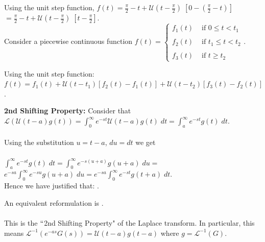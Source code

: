 \documentclass{ximera}
\begin{document}
\newpage

 Using the unit step function, $f(t)=\frac{\pi}{2}-t+\mathcal{U}\left(t-\frac{\pi}{2}\right)\;\left[0-\left(\frac{\pi}{2}-t\right)\right]$  $=\frac{\pi}{2}-t+\mathcal{U}\left(t-\frac{\pi}{2}\right)\;\left[t-\frac{\pi}{2}\right]$.\\


 Consider a piecewise continuous function $\displaystyle f(t)=\left\{\begin{array}{lr}
       f_{1}(t) & \mbox{ if }0\leq t<t_{1}\\
      \\
       f_{2}(t) &  \mbox{ if } t_{1}\leq t<t_{2} \\
       \\
       f_{3}(t) &  \mbox{ if }t\geq t_{2}
     \end{array}\right.$.

     \bigskip

     Using the unit step function:  \\ $f(t)=f_{1}(t)+\mathcal{U}(t-t_{1})[f_{2}(t)-f_{1}(t)]+\mathcal{U}(t-t_{2})[f_{3}(t)-f_{2}(t)]$.




     \textbf{2nd Shifting Property:} Consider that \\ $\displaystyle \mathcal{L}(\mathcal{U}(t-a)g(t))=\displaystyle \int_{0}^{\infty}e^{-st}\mathcal{U}(t-a)g(t)\;dt=\displaystyle \int_{a}^{\infty}e^{-st}g(t)\;dt$. \\ \\   Using the substitution $u=t-a$, $du=dt$ we get \\ \\  $\displaystyle \int_{a}^{\infty}e^{-st}g(t)\;dt=\int_{0}^{\infty}e^{-s(u+a)}g(u+a)\;du=$  $\displaystyle e^{-sa}\int_{0}^{\infty}e^{-su}g(u+a)\;du=e^{-sa}\int_{0}^{\infty}e^{-st}g(t+a)\;dt$.\\

     Hence we have justified that: .

     An equivalent reformulation is .  \\ \\ This is the $``$2nd Shifting Property" of the Laplace transform.  In particular, this means $\mathcal{L}^{-1}(e^{-as}G(s))=\mathcal{U}(t-a)g(t-a)$ where $g=\mathcal{L}^{-1}(G)$.\\
\end{document}
